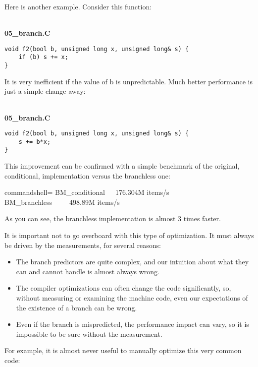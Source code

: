 Here is another example. Consider this function:

\hspace*{\fill} \\ %
\noindent
\textbf{05\_branch.C}
\begin{lstlisting}[style=styleCXX]
void f2(bool b, unsigned long x, unsigned long& s) {
	if (b) s += x;
}
\end{lstlisting}

It is very inefficient if the value of b is unpredictable. Much better performance is just a simple change away:

\hspace*{\fill} \\ %
\noindent
\textbf{05\_branch.C}
\begin{lstlisting}[style=styleCXX]
void f2(bool b, unsigned long x, unsigned long& s) {
	s += b*x;
}
\end{lstlisting}

This improvement can be confirmed with a simple benchmark of the original, conditional, implementation versus the branchless one:

\begin{tcblisting}{commandshell={}}
BM_conditional   176.304M items/s
BM_branchless     498.89M items/s
\end{tcblisting}

As you can see, the branchless implementation is almost 3 times faster.

It is important not to go overboard with this type of optimization. It must always be driven by the measurements, for several reasons:

\begin{itemize}
\item
The branch predictors are quite complex, and our intuition about what they can and cannot handle is almost always wrong.

\item
The compiler optimizations can often change the code significantly, so, without  measuring or examining the machine code, even our expectations of the existence of a branch can be wrong.

\item
Even if the branch is mispredicted, the performance impact can vary, so it is impossible to be sure without the measurement.
\end{itemize}

For example, it is almost never useful to manually optimize this very common code:

